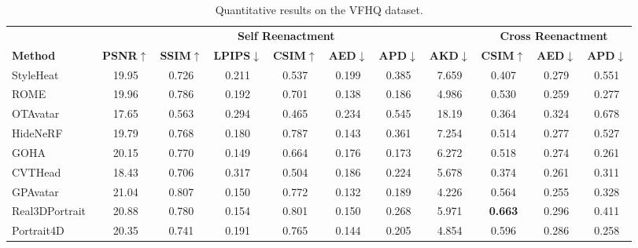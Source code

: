 \begin{table*}[ht]
    \centering
    \caption{Quantitative results on the VFHQ dataset. }
    \label{tab:results_vfhq}
    \vspace{-.05in}
    \begin{tabular}{l|ccccccc|ccc}
        \toprule
        & \multicolumn{7}{c|}{\textbf{Self Reenactment}} & \multicolumn{3}{c}{\textbf{Cross Reenactment}} \\
        \textbf{Method} & \textbf{PSNR$\uparrow$} & \textbf{SSIM$\uparrow$} & \textbf{LPIPS$\downarrow$} & \textbf{CSIM$\uparrow$} & \textbf{AED$\downarrow$} & \textbf{APD$\downarrow$} & \textbf{AKD$\downarrow$} & \textbf{CSIM$\uparrow$} & \textbf{AED$\downarrow$} & \textbf{APD$\downarrow$} \\
        \midrule
        StyleHeat~\citep{styleheat2022}             & 19.95      & 0.726      & 0.211      & 0.537      & 0.199      & 0.385      & 7.659      & 0.407      & 0.279      & 0.551      \\
        ROME~\citep{rome2022}                       & 19.96      & 0.786      & 0.192      & 0.701      & 0.138      & {0.186} & 4.986      & 0.530      & {0.259} & 0.277      \\
        OTAvatar~\citep{otavatar2023}               & 17.65      & 0.563      & 0.294      & 0.465      & 0.234      & 0.545      & 18.19      & 0.364      & 0.324      & 0.678      \\
        HideNeRF~\citep{hidenerf2023}               & 19.79      & 0.768      & 0.180      & 0.787      & 0.143      & 0.361      & 7.254      & 0.514      & 0.277      & 0.527      \\
        GOHA~\citep{goha2023}                       & 20.15      & 0.770      & {0.149} & 0.664      & 0.176      & {0.173} & 6.272      & 0.518      & 0.274      & {0.261} \\
        CVTHead~\citep{ma2024cvthead}               & 18.43      & 0.706      & 0.317      & 0.504      & 0.186      & 0.224      & 5.678      & 0.374      & 0.261      & 0.311      \\
        GPAvatar~\citep{gpavatar2024}               & {21.04} & {0.807} & 0.150      & 0.772      & {0.132} & 0.189      & {4.226} & 0.564      & {0.255} & 0.328      \\
        Real3DPortrait~\citep{ye2024real3d}         & 20.88      & 0.780      & 0.154      & {0.801} & 0.150      & 0.268      & 5.971      & \textbf{0.663} & 0.296      & 0.411      \\
        Portrait4D~\citep{deng2024portrait4d}       & 20.35      & 0.741      & 0.191      & 0.765      & 0.144      & 0.205      & 4.854      & 0.596      & 0.286      & {0.258} \\

\end{tabular}
\end{table*}
